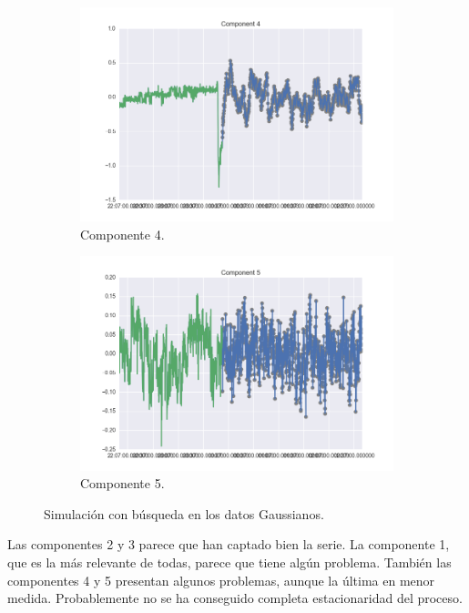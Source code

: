 \documentclass[11pt,spanish,listoffigures,listoftables]{tfgetsinf}
\begin{document}
\begin{figure}[H]
\begin{subfigure}[h]{0.49\textwidth}
                \includegraphics[width=\textwidth]{c4_simulation_arima_gaussian.png}
                \caption{Componente 4.}
                \label{fig:c4_simulation_arima_gaussian}
            \end{subfigure}
            \begin{subfigure}[h]{0.49\textwidth}
                \centering
                \includegraphics[width=\textwidth]{c5_simulation_arima_gaussian.png}
                \caption{Componente 5.}
                \label{fig:c5_simulation_arima_gaussian}
            \end{subfigure}
            \caption{Simulación con búsqueda en los datos Gaussianos.}
            \label{fig:simulation_arima_gaussian}
        \end{figure}
        
        Las componentes 2 y 3 parece que han captado bien la serie. La componente 1, que es la más relevante de todas, parece que tiene algún problema. También las componentes 4 y 5 presentan algunos problemas, aunque la última en menor medida. Probablemente no se ha conseguido completa estacionaridad del proceso.
        
\end{document}
